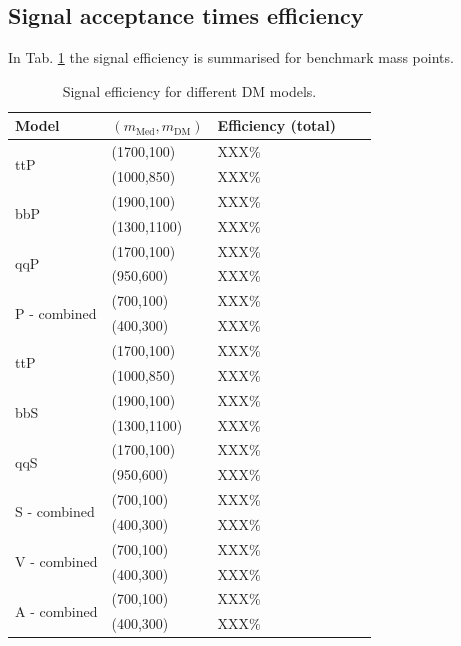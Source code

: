 \clearpage
\subsection{Signal acceptance times efficiency}
\label{sec:sig-accept-contam-DM}

In Tab. \ref{tab:sig-eff-DM} the signal efficiency is summarised for benchmark
mass points.

\begin{table}[h!]
    \scriptsize
	\caption{Signal efficiency for different DM models.}
    \label{tab:sig-eff-DM}
    \centering
    \begin{tabular}{ lllll }
        \hline \hline
        Model & $(m_{\mathrm{Med}},m_{\mathrm{DM}})$ & Efficiency (total) \\ 
        \hline
        \multirow{2}{*}{ttP}
            & (1700,100) & XXX\% \\
            & (1000,850) & XXX\% \\
        \hline
        \multirow{2}{*}{bbP}
            & (1900,100)  & XXX\% \\
            & (1300,1100) & XXX\% \\
        \hline
        \multirow{2}{*}{qqP}
            & (1700,100) & XXX\% \\
            & (950,600)  & XXX\% \\
        \hline
        \multirow{2}{*}{P - combined}
            & (700,100) & XXX\% \\
            & (400,300) & XXX\% \\
        \multirow{2}{*}{ttP}
            & (1700,100) & XXX\% \\
            & (1000,850) & XXX\% \\
        \hline
        \multirow{2}{*}{bbS}
            & (1900,100)  & XXX\% \\
            & (1300,1100) & XXX\% \\
        \hline
        \multirow{2}{*}{qqS}
            & (1700,100) & XXX\% \\
            & (950,600)  & XXX\% \\
        \hline
        \multirow{2}{*}{S - combined}
            & (700,100) & XXX\% \\
            & (400,300) & XXX\% \\
        \hline
        \multirow{2}{*}{V - combined}
            & (700,100) & XXX\% \\
            & (400,300) & XXX\% \\
        \hline
        \multirow{2}{*}{A - combined}
            & (700,100) & XXX\% \\
            & (400,300) & XXX\% \\
        \hline \hline
    \end{tabular}
\end{table}

